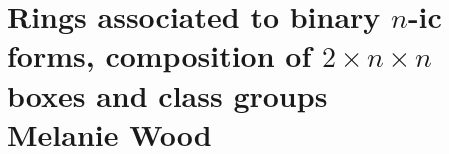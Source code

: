 \chapter{Rings associated to binary $n$-ic forms, composition of $2 \times n \times n$ boxes and class groups \\ Melanie Wood}\label{ch:13}